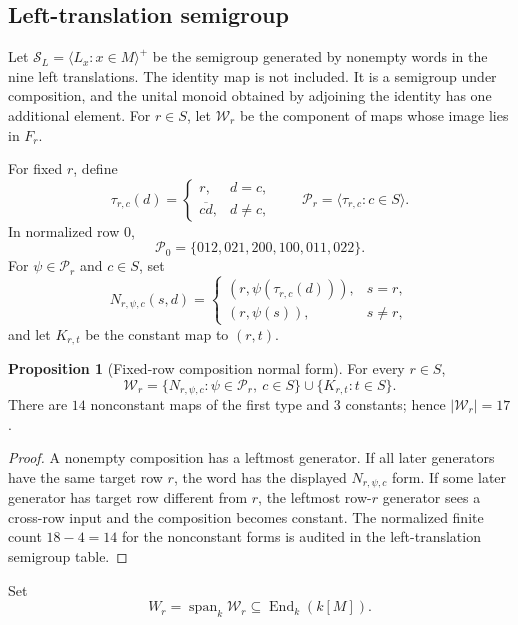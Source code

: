 \documentclass[11pt]{article}
\theoremstyle{definition}
\newtheorem{proposition}[theorem]{Proposition}
\begin{document}
\subsection{Left-translation semigroup}\label{positive-left-translation-semigroup}\label{left-translation-semigroup-and-directed-edge-representation}

Let \(\mathcal S_L=\langle L_x:x\in M\rangle^+\) be the semigroup
generated by nonempty words in the nine left translations.  The identity map is not included.  It is a
semigroup under composition, and the unital monoid obtained by adjoining the
identity has one additional element.  For \(r\in S\), let \(\mathcal W_r\) be
the component of maps whose image lies in \(F_r\).

For fixed \(r\), define
\[
\tau_{r,c}(d)=
\begin{cases}
r, & d=c,\\
\overline{cd}, & d\ne c,
\end{cases}
\qquad
\mathcal P_r=\langle \tau_{r,c}:c\in S\rangle.
\]
In normalized row \(0\),
\[
\mathcal P_0=\{012,021,200,100,011,022\}.
\]
For \(\psi\in\mathcal P_r\) and \(c\in S\), set
\[
N_{r,\psi,c}(s,d)=
\begin{cases}
(r,\psi(\tau_{r,c}(d))), & s=r,\\
(r,\psi(s)), & s\ne r,
\end{cases}
\]
and let \(K_{r,t}\) be the constant map to \((r,t)\).

\begin{proposition}[Fixed-row composition normal form]
\label{prop:15.1}
For every \(r\in S\),
\[
\mathcal W_r=
\{N_{r,\psi,c}:\psi\in\mathcal P_r,\ c\in S\}
\cup
\{K_{r,t}:t\in S\}.
\]
There are \(14\) nonconstant maps of the first type and \(3\) constants;
hence \(|\mathcal W_r|=17\).
\end{proposition}

\begin{proof}
A nonempty composition has a leftmost generator.  If all later
generators have the same target row \(r\), the word has the displayed
\(N_{r,\psi,c}\) form.  If some later generator has target row different from
\(r\), the leftmost row-\(r\) generator sees a cross-row input and the
composition becomes constant.  The normalized finite count \(18-4=14\) for
the nonconstant forms is audited in the left-translation semigroup table.
\end{proof}

Set
\[
W_r=\operatorname{span}_k\mathcal W_r
\subseteq \operatorname{End}_k(k[M]).
\]
\end{document}
